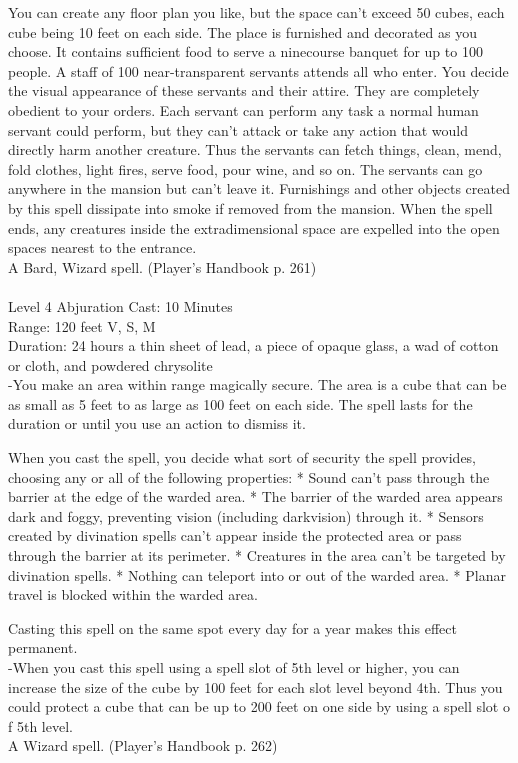 \documentclass[10pt,twocolumn]{report}
\begin{document}
You can create any floor plan you like, but the space can’t exceed 50 cubes, each cube being 10 feet on each side. The place is furnished and decorated as you choose. It contains sufficient food to serve a ninecourse banquet for up to 100 people. A staff of 100 near-transparent servants attends all who enter. You decide the visual appearance of these servants and their attire. They are completely obedient to your orders. Each servant can perform any task a normal human servant could perform, but they can’t attack or take any action that would directly harm another creature. Thus the servants can fetch things, clean, mend, fold clothes, light fires, serve food, pour wine, and so on. The servants can go anywhere in the mansion but can’t leave it. Furnishings and other objects created by this spell dissipate into smoke if removed from the mansion. When the spell ends, any creatures inside the extradimensional space are expelled into the open spaces nearest to the entrance.\\
A Bard, Wizard spell. (Player's Handbook p. 261) \\


 \\
Level 4 \quad Abjuration \quad Cast: 10 Minutes\\
Range: 120 feet \quad V, S, M\\
Duration: 24 hours \quad a thin sheet of lead, a piece of opaque glass, a wad of cotton or cloth, and powdered chrysolite\\
-You make an area within range magically secure.
The area is a cube that can be as small as 5 feet to as large as 100 feet on each side. The spell lasts for the duration or until you use an action to dismiss it.

When you cast the spell, you decide what sort of security the spell provides, choosing any or all of the following properties:
* Sound can’t pass through the barrier at the edge of the warded area.
* The barrier of the warded area appears dark and foggy, preventing vision (including darkvision) through it.
* Sensors created by divination spells can’t appear inside the protected area or pass through the barrier at its perimeter.
* Creatures in the area can’t be targeted by divination spells.
* Nothing can teleport into or out of the warded area.
* Planar travel is blocked within the warded area.

Casting this spell on the same spot every day for a year makes this effect permanent.\\
-When you cast this spell using a spell slot of 5th level or higher, you can increase the size of the cube by 100 feet for each slot level beyond 4th. Thus you could protect a cube that can be up to 200 feet on one side by using a spell slot o f 5th level.\\
A Wizard spell. (Player's Handbook p. 262) \\
\end{document}
